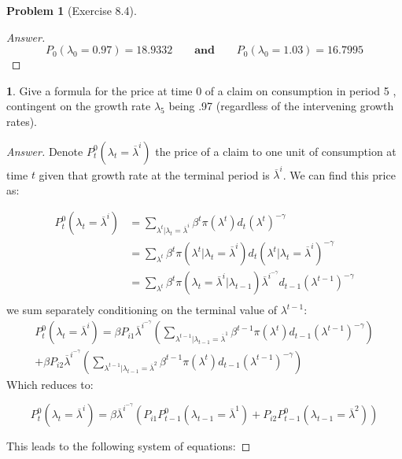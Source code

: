 \documentclass[12pt]{article}
\theoremstyle{definition}
\newtheorem{problem}{Problem}
\newtheorem{subproblem}{}[problem]
\newcommand{\qaq}{\qquad \textbf{and} \qquad}
\begin{document}
\begin{problem}[Exercise 8.4]
\begin{proof}[Answer]
$$P_0(\lambda_0 = 0.97) = 18.9332 \qaq P_0(\lambda_0 = 1.03) = 16.7995$$ 

\end{proof}
\begin{subproblem}
Give a formula for the price at time 0 of a claim on consumption in period 5 , contingent on the growth rate $\lambda_{5}$ being .97 (regardless of the intervening growth rates).
\end{subproblem}
\begin{proof}[Answer]
Denote $P^0_t(\lambda_t=\overline{\lambda}^i)$ the price of a claim to one unit of consumption at time $t$ given that growth rate at the terminal period is $\overline{\lambda}^i$. We can find this price as:

\begin{align*}
P^0_t(\lambda_t=\overline{\lambda}^i) &= \sum_{\lambda^t | \lambda_t = \overline{\lambda}^i } \beta^t\pi(\lambda^t)d_t(\lambda^t)^{-\gamma}\\ &=
\sum_{\lambda^t} \beta^t\pi(\lambda^t | \lambda_t = \overline{\lambda}^i )d_t(\lambda^t | \lambda_t = \overline{\lambda}^i )^{-\gamma}\\
& =\sum_{\lambda^t } \beta^t\pi(\lambda_t = \overline{\lambda}^i | \lambda_{t-1})\overline{\lambda}^{i}^{-\gamma}d_{t-1}(\lambda^{t-1})^{-\gamma}\\
\end{align*}
we sum separately conditioning on the terminal value of $\lambda^{t-1}$:
\begin{multline*}
P^0_t(\lambda_t=\overline{\lambda}^i) = \beta P_{i1}\overline{\lambda}^{i}^{-\gamma}\left( \sum_{\lambda^{t-1} | \lambda_{t-1} = \overline{\lambda}^1 } \beta^{t-1}\pi(\lambda^t)d_{t-1}(\lambda^{t-1})^{-\gamma}\right) \\+ \beta P_{i2}\overline{\lambda}^{i}^{-\gamma}\left( \sum_{\lambda^{t-1} | \lambda_{t-1} = \overline{\lambda}^2 } \beta^{t-1}\pi(\lambda^t)d_{t-1}(\lambda^{t-1})^{-\gamma}\right)    
\end{multline*}
Which reduces to:

$$P_t^{0}(\lambda_t=\overline{\lambda}^i) = \beta \overline{\lambda}^{i}^{-\gamma}\left(P_{i1}P_{t-1}^{0}(\lambda_{t-1}=\overline{\lambda}^1) + P_{i2}P_{t-1}^{0}(\lambda_{t-1}=\overline{\lambda}^2)\right)$$

This leads to the following system of equations:


\end{proof}
\end{problem}
\end{document}
